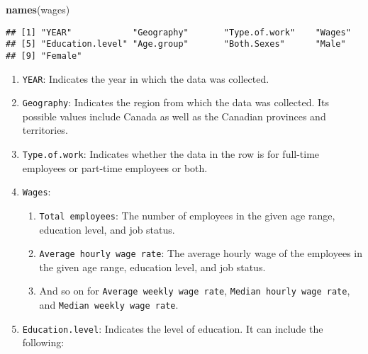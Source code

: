 \documentclass[
]{article}
\newenvironment{Shaded}{\begin{snugshade}}{\end{snugshade}}
\newcommand{\FunctionTok}[1]{\textcolor[rgb]{0.13,0.29,0.53}{\textbf{#1}}}
\newcommand{\NormalTok}[1]{#1}
\providecommand{\tightlist}{%
  \setlength{\itemsep}{0pt}\setlength{\parskip}{0pt}}
\begin{document}
\begin{Shaded}
\begin{Highlighting}[]
\FunctionTok{names}\NormalTok{(wages)}
\end{Highlighting}
\end{Shaded}

\begin{verbatim}
## [1] "YEAR"            "Geography"       "Type.of.work"    "Wages"          
## [5] "Education.level" "Age.group"       "Both.Sexes"      "Male"           
## [9] "Female"
\end{verbatim}

\begin{enumerate}
\def\labelenumi{\arabic{enumi}.}
\tightlist
\item
  \texttt{YEAR}: Indicates the year in which the data was collected.
\item
  \texttt{Geography}: Indicates the region from which the data was
  collected. Its possible values include Canada as well as the Canadian
  provinces and territories.
\item
  \texttt{Type.of.work}: Indicates whether the data in the row is for
  full-time employees or part-time employees or both.
\item
  \texttt{Wages}:

  \begin{enumerate}
  \def\labelenumii{\arabic{enumii}.}
  \tightlist
  \item
    \texttt{Total\ employees}: The number of employees in the given age
    range, education level, and job status.
  \item
    \texttt{Average\ hourly\ wage\ rate}: The average hourly wage of the
    employees in the given age range, education level, and job status.
  \item
    And so on for \texttt{Average\ weekly\ wage\ rate},
    \texttt{Median\ hourly\ wage\ rate}, and
    \texttt{Median\ weekly\ wage\ rate}.
  \end{enumerate}
\item
  \texttt{Education.level}: Indicates the level of education. It can
  include the following:
\end{enumerate}
\end{document}
